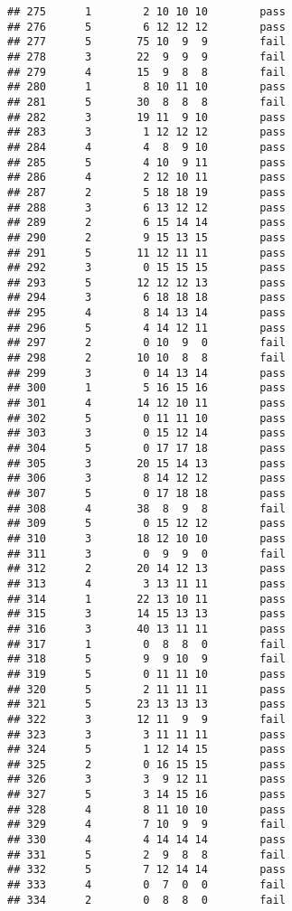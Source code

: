 \documentclass[
]{article}
\begin{document}
\begin{verbatim}
## 275      1        2 10 10 10        pass
## 276      5        6 12 12 12        pass
## 277      5       75 10  9  9        fail
## 278      3       22  9  9  9        fail
## 279      4       15  9  8  8        fail
## 280      1        8 10 11 10        pass
## 281      5       30  8  8  8        fail
## 282      3       19 11  9 10        pass
## 283      3        1 12 12 12        pass
## 284      4        4  8  9 10        pass
## 285      5        4 10  9 11        pass
## 286      4        2 12 10 11        pass
## 287      2        5 18 18 19        pass
## 288      3        6 13 12 12        pass
## 289      2        6 15 14 14        pass
## 290      2        9 15 13 15        pass
## 291      5       11 12 11 11        pass
## 292      3        0 15 15 15        pass
## 293      5       12 12 12 13        pass
## 294      3        6 18 18 18        pass
## 295      4        8 14 13 14        pass
## 296      5        4 14 12 11        pass
## 297      2        0 10  9  0        fail
## 298      2       10 10  8  8        fail
## 299      3        0 14 13 14        pass
## 300      1        5 16 15 16        pass
## 301      4       14 12 10 11        pass
## 302      5        0 11 11 10        pass
## 303      3        0 15 12 14        pass
## 304      5        0 17 17 18        pass
## 305      3       20 15 14 13        pass
## 306      3        8 14 12 12        pass
## 307      5        0 17 18 18        pass
## 308      4       38  8  9  8        fail
## 309      5        0 15 12 12        pass
## 310      3       18 12 10 10        pass
## 311      3        0  9  9  0        fail
## 312      2       20 14 12 13        pass
## 313      4        3 13 11 11        pass
## 314      1       22 13 10 11        pass
## 315      3       14 15 13 13        pass
## 316      3       40 13 11 11        pass
## 317      1        0  8  8  0        fail
## 318      5        9  9 10  9        fail
## 319      5        0 11 11 10        pass
## 320      5        2 11 11 11        pass
## 321      5       23 13 13 13        pass
## 322      3       12 11  9  9        fail
## 323      3        3 11 11 11        pass
## 324      5        1 12 14 15        pass
## 325      2        0 16 15 15        pass
## 326      3        3  9 12 11        pass
## 327      5        3 14 15 16        pass
## 328      4        8 11 10 10        pass
## 329      4        7 10  9  9        fail
## 330      4        4 14 14 14        pass
## 331      5        2  9  8  8        fail
## 332      5        7 12 14 14        pass
## 333      4        0  7  0  0        fail
## 334      2        0  8  8  0        fail

\end{verbatim}
\end{document}
